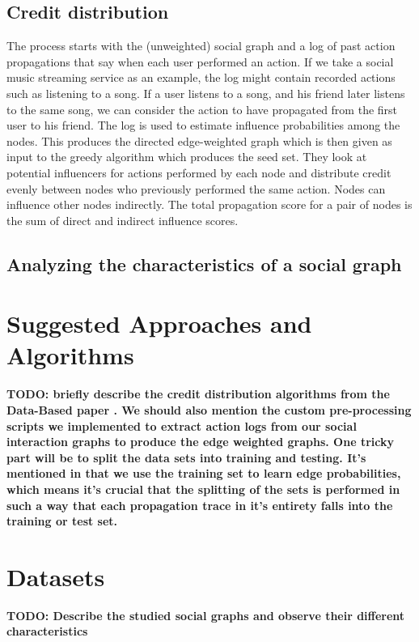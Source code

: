 \documentclass{acm_proc_article-sp}
\begin{document}
\subsection{Credit distribution}

The process starts with the (unweighted) social graph and a log of past action propagations that say when each user performed an action. If we take a social music streaming service as an example, the log might contain recorded actions such as listening to a song. If a user listens to a song, and his friend later listens to the same song, we can consider the action to have propagated from the first user to his friend. The log is used to estimate influence probabilities among the nodes. This produces the directed edge-weighted graph which is then given as input to the greedy algorithm which produces the seed set. They look at potential influencers for actions performed by each node and distribute credit evenly between nodes who previously performed the same action. Nodes can influence other nodes indirectly. The total propagation score for a pair of nodes is the sum of direct and indirect influence scores.

\subsection{Analyzing the characteristics of a social graph}


\section{Suggested Approaches and Algorithms}
\textbf{TODO: briefly describe the credit distribution algorithms from the Data-Based paper \cite{goyal:datainfluence}.
We should also mention the custom pre-processing scripts we implemented to extract action logs from our social interaction graphs to produce the edge weighted graphs. One tricky part will be to split the data sets into training and testing. It's mentioned in \cite{goyal:datainfluence} that we use the training set to learn edge probabilities, which means it's crucial that the splitting of the sets is performed in such a way that each propagation trace in it's entirety falls into the training or test set.}


\section{Datasets}
\textbf{TODO: Describe the studied social graphs and observe their different characteristics}
\end{document}
